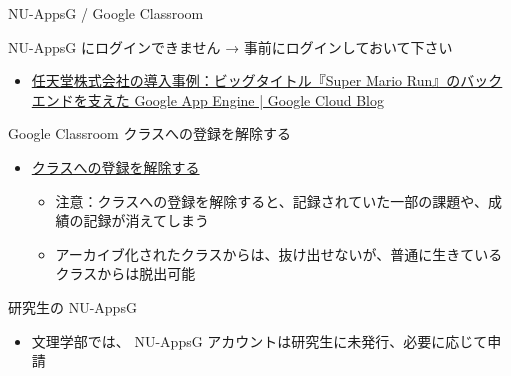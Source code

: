 \documentclass[a4j,10pt]{jsarticle}
\def\lthtmlcheckvsize{\ifdim\ht\sizebox<\vsize 
  \ifdim\wd\sizebox<\hsize\expandafter\hfill\fi \expandafter\vfill
  \else\expandafter\vss\fi}%
\begin{document}
{\begin{frame}[label={sec:orgbe869cf},fragile]{NU-AppsG / Google Classroom}
\begin{block}{NU-AppsG にログインできません → 事前にログインしておいて下さい}
\begin{itemize}
\begin{itemize}
\item \href{https://cloud.google.com/blog/ja/topics/customers/super-mario-run-google-app-engine}{任天堂株式会社の導入事例：ビッグタイトル『Super Mario Run』のバックエンドを支えた Google App Engine | Google Cloud Blog}
\end{itemize}
\end{itemize}
\end{block}
\par
\begin{block}{Google Classroom クラスへの登録を解除する}
\begin{itemize}
\item \href{https://support.google.com/edu/classroom/answer/6069981?co=GENIE.Platform\%3DDesktop\&hl=ja}{クラスへの登録を解除する}
\begin{itemize}
\item 注意：クラスへの登録を解除すると、記録されていた一部の課題や、成績の記録が消えてしまう
\item アーカイブ化されたクラスからは、抜け出せないが、普通に生きているクラスからは脱出可能
\end{itemize}
\end{itemize}
\end{block}
\par
\begin{block}{研究生の NU-AppsG}
\begin{itemize}
\item 文理学部では、 NU-AppsG アカウントは研究生に未発行、必要に応じて申請
\end{itemize}
\end{block}
\end{frame}%
\lthtmlfigureZ
\lthtmlcheckvsize\clearpage}
\end{document}
